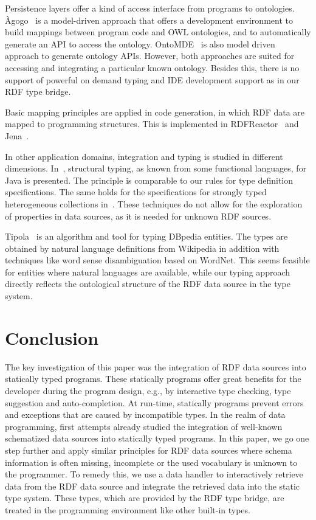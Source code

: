 \documentclass{llncs} %
\begin{document}
Persistence layers offer a kind of access interface from programs to ontologies.
\`{A}gogo~\cite{AGOGO} is a model-driven approach that offers a development environment
to build mappings between program code and OWL ontologies, and to automatically generate 
an API to access the ontology.
OntoMDE~\cite{conf/esws/ScheglmannSS12} is also model driven approach to generate ontology APIs.
However, both approaches are suited for accessing and integrating a particular known ontology.
Besides this, there is no support of powerful on demand typing and IDE development support
as in our RDF type bridge.


Basic mapping principles are applied
in code generation, in which RDF data are mapped to programming structures.
This is implemented in RDFReactor~\cite{rdfreactor-iswc2005-poster} and Jena~\cite{carroll2004jena}.


In other application domains, integration and typing is studied in different dimensions. 
 In~\cite{GilM08}, structural typing, as known from some functional languages, for Java is presented. 
The principle is comparable to our rules for type definition specifications.
The same holds for the specifications for strongly typed heterogeneous collections in~\cite{BrachaL92,KiselyovLS04}.
These techniques do not allow for the exploration of properties in data sources, as it is needed
for unknown RDF sources.

Tipola~\cite{DBLP:conf/semweb/GangemiNPDMC12} is an algorithm and tool for typing DBpedia entities. The types are obtained by natural language definitions
from Wikipedia in addition with techniques like word sense disambiguation based on WordNet. This seems feasible
for entities where natural languages are available, while our typing approach directly reflects the ontological structure
of the RDF data source in the type system.

\section{Conclusion}
\label{sec:conclusion}

The key investigation of this paper was the integration of RDF data sources
into statically typed programs. These statically programs offer great benefits for
the developer during the program design, e.g., by interactive type checking, type suggestion
and auto-completion. At run-time, statically programs prevent errors and exceptions
that are caused by incompatible types. In the realm of data programming, first attempts
already studied the integration of well-known schematized data sources into statically
typed programs. In this paper, we go one step further and apply similar principles for
RDF data sources where schema information is often missing, incomplete or
the used vocabulary is unknown to the programmer. To remedy this,
we use a data handler to interactively retrieve data from the RDF data source
and integrate the retrieved data into the static type system.
These types, which are provided by the RDF type bridge, are treated
in the programming environment like other built-in types.
\end{document}
